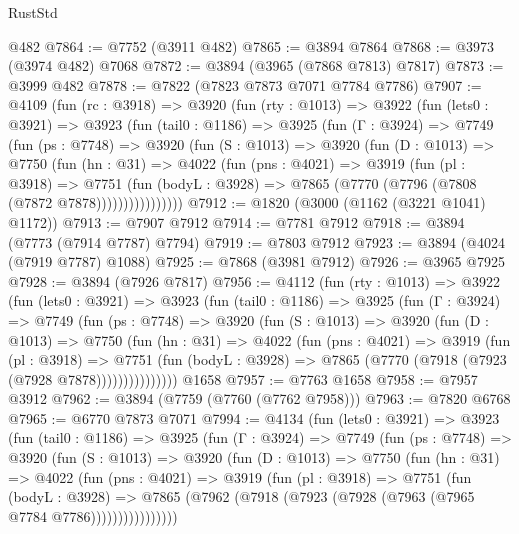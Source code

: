 \begin{lexlean}{RustStd}
\begin{coremodule}
    @482
@7864 := @7752 (@3911 @482)
@7865 := @3894 @7864
@7868 := @3973 (@3974 @482) @7068
@7872 := @3894 (@3965 (@7868 @7813) @7817)
@7873 := @3999 @482
@7878 := @7822 (@7823 @7873 @7071 @7784 @7786)
@7907 := @4109
    (fun (rc : @3918) =>
    @3920
      (fun (rty : @1013) =>
      @3922
        (fun (lets0 : @3921) =>
        @3923
          (fun (tail0 : @1186) =>
          @3925
            (fun (Γ : @3924) =>
            @7749
              (fun (ps : @7748) =>
              @3920
                (fun (S : @1013) =>
                @3920
                  (fun (D : @1013) =>
                  @7750
                    (fun (hn : @31) =>
                    @4022
                      (fun (pns : @4021) =>
                      @3919
                        (fun (pl : @3918) =>
                        @7751
                          (fun (bodyL : @3928) =>
                          @7865 (@7770 (@7796 (@7808 (@7872 @7878))))))))))))))))
@7912 := @1820 (@3000 (@1162 (@3221 @1041) @1172))
@7913 := @7907 @7912
@7914 := @7781 @7912
@7918 := @3894 (@7773 (@7914 @7787) @7794)
@7919 := @7803 @7912
@7923 := @3894 (@4024 (@7919 @7787) @1088)
@7925 := @7868 (@3981 @7912)
@7926 := @3965 @7925
@7928 := @3894 (@7926 @7817)
@7956 := @4112
    (fun (rty : @1013) =>
    @3922
      (fun (lets0 : @3921) =>
      @3923
        (fun (tail0 : @1186) =>
        @3925
          (fun (Γ : @3924) =>
          @7749
            (fun (ps : @7748) =>
            @3920
              (fun (S : @1013) =>
              @3920
                (fun (D : @1013) =>
                @7750
                  (fun (hn : @31) =>
                  @4022
                    (fun (pns : @4021) =>
                    @3919
                      (fun (pl : @3918) =>
                      @7751
                        (fun (bodyL : @3928) =>
                        @7865 (@7770 (@7918 (@7923 (@7928 @7878)))))))))))))))
    @1658
@7957 := @7763 @1658
@7958 := @7957 @3912
@7962 := @3894 (@7759 (@7760 (@7762 @7958)))
@7963 := @7820 @6768
@7965 := @6770 @7873 @7071
@7994 := @4134
    (fun (lets0 : @3921) =>
    @3923
      (fun (tail0 : @1186) =>
      @3925
        (fun (Γ : @3924) =>
        @7749
          (fun (ps : @7748) =>
          @3920
            (fun (S : @1013) =>
            @3920
              (fun (D : @1013) =>
              @7750
                (fun (hn : @31) =>
                @4022
                  (fun (pns : @4021) =>
                  @3919
                    (fun (pl : @3918) =>
                    @7751
                      (fun (bodyL : @3928) =>
                      @7865 (@7962 (@7918 (@7923 (@7928 (@7963 (@7965 @7784 @7786))))))))))))))))

\end{coremodule}
\end{lexlean}
